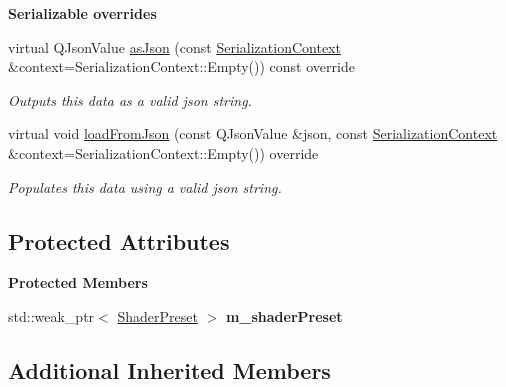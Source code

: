 \begin{Indent}\textbf{ Serializable overrides}\par
\begin{DoxyCompactItemize}
\item 
\mbox{\label{classrev_1_1_shader_component_a960cbabde1a566c721bcdb5640d236eb}} 
virtual Q\+Json\+Value \mbox{\hyperlink{classrev_1_1_shader_component_a960cbabde1a566c721bcdb5640d236eb}{as\+Json}} (const \mbox{\hyperlink{structrev_1_1_serialization_context}{Serialization\+Context}} \&context=Serialization\+Context\+::\+Empty()) const override
\begin{DoxyCompactList}\small\item\em Outputs this data as a valid json string. \end{DoxyCompactList}\item 
\mbox{\label{classrev_1_1_shader_component_a0822c1517cf55d1e29197357234b67d1}} 
virtual void \mbox{\hyperlink{classrev_1_1_shader_component_a0822c1517cf55d1e29197357234b67d1}{load\+From\+Json}} (const Q\+Json\+Value \&json, const \mbox{\hyperlink{structrev_1_1_serialization_context}{Serialization\+Context}} \&context=Serialization\+Context\+::\+Empty()) override
\begin{DoxyCompactList}\small\item\em Populates this data using a valid json string. \end{DoxyCompactList}\end{DoxyCompactItemize}
\end{Indent}
\subsection*{Protected Attributes}
\begin{Indent}\textbf{ Protected Members}\par
\begin{DoxyCompactItemize}
\item 
\mbox{\label{classrev_1_1_shader_component_a2616789c8d868780651343dbb07a9e73}} 
std\+::weak\+\_\+ptr$<$ \mbox{\hyperlink{classrev_1_1_shader_preset}{Shader\+Preset}} $>$ {\bfseries m\+\_\+shader\+Preset}
\end{DoxyCompactItemize}
\end{Indent}
\subsection*{Additional Inherited Members}


